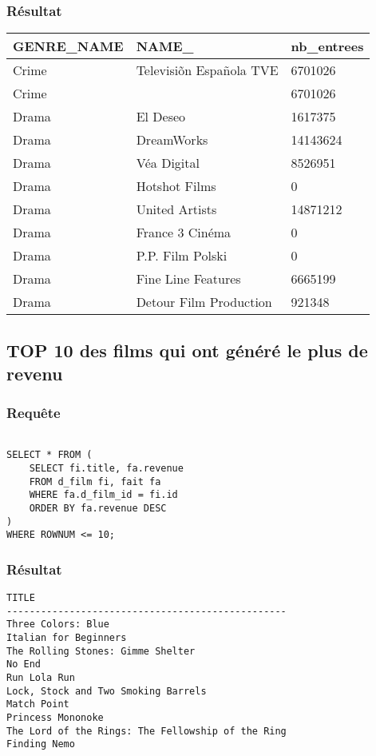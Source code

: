 \subsubsection{Résultat}
\begin{table}[H]
	\centering
	\begin{tabular}{ l  l  l }
		GENRE\_NAME  &  NAME\_      &  nb\_entrees \\
		\hline
Crime  &  Televisiõn Española TVE	 &  6701026 \\
Crime  & 								 &  6701026 \\
Drama  &  El Deseo					 &  1617375 \\
Drama  &  DreamWorks					 &  14143624 \\
Drama  &  Véa Digital				 &  8526951 \\
Drama  &  Hotshot Films				 &  0 \\
Drama  &  United Artists				 &  14871212 \\
Drama  &  France 3 Cinéma			 &  0 \\
Drama  &  P.P. Film Polski			 &  0 \\
Drama  &  Fine Line Features			 &  6665199 \\
Drama  &  Detour Film Production		 &  921348 \\
	\end{tabular}
\end{table}


\subsection{TOP 10 des films qui ont généré le plus de revenu}
\subsubsection{Requête}
\begin{lstlisting}

SELECT * FROM (
	SELECT fi.title, fa.revenue
	FROM d_film fi, fait fa
	WHERE fa.d_film_id = fi.id
	ORDER BY fa.revenue DESC
)
WHERE ROWNUM <= 10;
\end{lstlisting}

\subsubsection{Résultat}
\begin{lstlisting}
TITLE
-------------------------------------------------
Three Colors: Blue
Italian for Beginners
The Rolling Stones: Gimme Shelter
No End
Run Lola Run
Lock, Stock and Two Smoking Barrels
Match Point
Princess Mononoke
The Lord of the Rings: The Fellowship of the Ring
Finding Nemo

\end{lstlisting}

